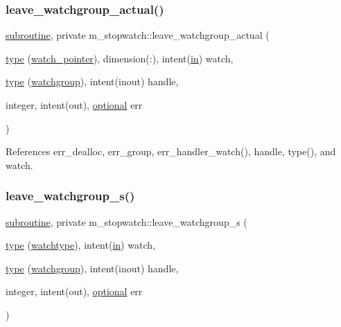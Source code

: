 \subsubsection{\texorpdfstring{leave\+\_\+watchgroup\+\_\+actual()}{leave\_watchgroup\_actual()}}
{\footnotesize\ttfamily \hyperlink{M__stopwatch_83_8txt_acfbcff50169d691ff02d4a123ed70482}{subroutine}, private m\+\_\+stopwatch\+::leave\+\_\+watchgroup\+\_\+actual (\begin{DoxyParamCaption}\item[{\hyperlink{stop__watch_83_8txt_a70f0ead91c32e25323c03265aa302c1c}{type} (\hyperlink{structm__stopwatch_1_1watch__pointer}{watch\+\_\+pointer}), dimension(\+:), intent(\hyperlink{M__journal_83_8txt_afce72651d1eed785a2132bee863b2f38}{in})}]{watch,  }\item[{\hyperlink{stop__watch_83_8txt_a70f0ead91c32e25323c03265aa302c1c}{type} (\hyperlink{structm__stopwatch_1_1watchgroup}{watchgroup}), intent(inout)}]{handle,  }\item[{integer, intent(out), \hyperlink{option__stopwatch_83_8txt_aa4ece75e7acf58a4843f70fe18c3ade5}{optional}}]{err }\end{DoxyParamCaption})\hspace{0.3cm}{\ttfamily [private]}}



References err\+\_\+dealloc, err\+\_\+group, err\+\_\+handler\+\_\+watch(), handle, type(), and watch.

\mbox{\label{namespacem__stopwatch_a9acf515866a63a203530c03d8fe59b98}} 
\subsubsection{\texorpdfstring{leave\+\_\+watchgroup\+\_\+s()}{leave\_watchgroup\_s()}}
{\footnotesize\ttfamily \hyperlink{M__stopwatch_83_8txt_acfbcff50169d691ff02d4a123ed70482}{subroutine}, private m\+\_\+stopwatch\+::leave\+\_\+watchgroup\+\_\+s (\begin{DoxyParamCaption}\item[{\hyperlink{stop__watch_83_8txt_a70f0ead91c32e25323c03265aa302c1c}{type} (\hyperlink{structm__stopwatch_1_1watchtype}{watchtype}), intent(\hyperlink{M__journal_83_8txt_afce72651d1eed785a2132bee863b2f38}{in})}]{watch,  }\item[{\hyperlink{stop__watch_83_8txt_a70f0ead91c32e25323c03265aa302c1c}{type} (\hyperlink{structm__stopwatch_1_1watchgroup}{watchgroup}), intent(inout)}]{handle,  }\item[{integer, intent(out), \hyperlink{option__stopwatch_83_8txt_aa4ece75e7acf58a4843f70fe18c3ade5}{optional}}]{err }\end{DoxyParamCaption})\hspace{0.3cm}{\ttfamily [private]}}



